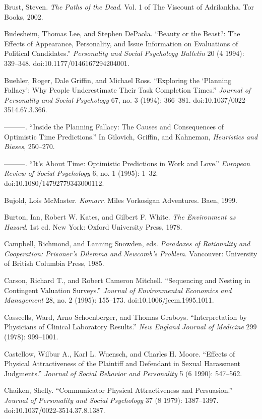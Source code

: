 {
 Brust, Steven. \textit{The Paths of the Dead}. Vol. 1 of The
Viscount of Adrilankha. Tor Books, 2002.}

{
 Budesheim, Thomas Lee, and Stephen DePaola.
``Beauty or the Beast?: The Effects of Appearance,
Personality, and Issue Information on Evaluations of Political
Candidates.'' \textit{Personality and Social
Psychology Bulletin} 20 (4 1994): 339--348.
doi:10.1177/0146167294204001.}

{
 Buehler, Roger, Dale Griffin, and Michael Ross.
``Exploring the `Planning
Fallacy': Why People Underestimate Their Task
Completion Times.'' \textit{Journal of Personality
and Social Psychology} 67, no. 3 (1994): 366--381.
doi:10.1037/0022-3514.67.3.366.}

{
 {}---{}---{}---. ``Inside the Planning Fallacy:
The Causes and Consequences of Optimistic Time
Predictions.'' In Gilovich, Griffin, and Kahneman,
\textit{Heuristics and Biases}, 250--270.}

{
 {}---{}---{}---. ``It's About
Time: Optimistic Predictions in Work and Love.''
\textit{European Review of Social Psychology} 6, no. 1 (1995): 1--32.
doi:10.1080/14792779343000112.}

{
 Bujold, Lois McMaster. \textit{Komarr}. Miles Vorkosigan
Adventures. Baen, 1999.}

{
 Burton, Ian, Robert W. Kates, and Gilbert F. White. \textit{The
Environment as Hazard}. 1st ed. New York: Oxford University Press,
1978.}

{
 Campbell, Richmond, and Lanning Snowden, eds. \textit{Paradoxes of
Rationality and Cooperation: Prisoner's Dilemma and
Newcomb's Problem}. Vancouver: University of British
Columbia Press, 1985.}

{
 Carson, Richard T., and Robert Cameron Mitchell.
``Sequencing and Nesting in Contingent Valuation
Surveys.'' \textit{Journal of Environmental Economics
and Management} 28, no. 2 (1995): 155--173.
doi:10.1006/jeem.1995.1011.}

{
 Casscells, Ward, Arno Schoenberger, and Thomas Graboys.
``Interpretation by Physicians of Clinical Laboratory
Results.'' \textit{New England Journal of Medicine}
299 (1978): 999--1001.}

{
 Castellow, Wilbur A., Karl L. Wuensch, and Charles H. Moore.
``Effects of Physical Attractiveness of the Plaintiff
and Defendant in Sexual Harassment Judgments.''
\textit{Journal of Social Behavior and Personality} 5 (6 1990):
547--562.}

{
 Chaiken, Shelly. ``Communicator Physical
Attractiveness and Persuasion.'' \textit{Journal of
Personality and Social Psychology} 37 (8 1979): 1387--1397.
doi:10.1037/0022-3514.37.8.1387.}

